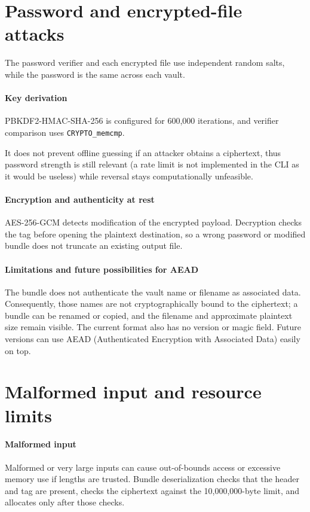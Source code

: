 \section{Password and encrypted-file attacks}

The password verifier and each encrypted file use independent random salts,
while the password is the same across each vault.

\paragraph{Key derivation}
PBKDF2-HMAC-SHA-256 is configured for 600,000 iterations, and verifier
comparison uses \texttt{CRYPTO\_memcmp}.

It does not prevent offline guessing if an attacker obtains a ciphertext,
thus password strength is still relevant (a rate limit is not implemented in the CLI
as it would be useless) while reversal stays computationally unfeasible.

\paragraph{Encryption and authenticity at rest}
AES-256-GCM detects modification of the encrypted payload. Decryption checks
the tag before opening the plaintext destination, so a wrong password or
modified bundle does not truncate an existing output file.

\paragraph{Limitations and future possibilities for AEAD}
The bundle does
not authenticate the vault name or filename as associated data. Consequently,
those names are not cryptographically bound to the ciphertext; a bundle can
be renamed or copied, and the filename and approximate plaintext size remain
visible. The current format also has no version or magic field. Future versions
can use AEAD (Authenticated Encryption with Associated Data) easily on top.

\section{Malformed input and resource limits}

\paragraph{Malformed input}
Malformed or very large inputs can cause out-of-bounds access or excessive
memory use if lengths are trusted. Bundle deserialization checks that the
header and tag are present, checks the ciphertext against the 10,000,000-byte
limit, and allocates only after those checks.

